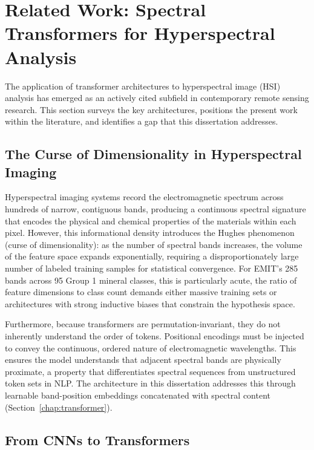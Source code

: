 \documentclass[11pt]{report}
\begin{document}
\section{Related Work: Spectral Transformers for Hyperspectral Analysis}

The application of transformer architectures to hyperspectral image (HSI) analysis has emerged as an actively cited subfield in contemporary remote sensing research.
This section surveys the key architectures, positions the present work within the literature, and identifies a gap that this dissertation addresses.

\subsection{The Curse of Dimensionality in Hyperspectral Imaging}

Hyperspectral imaging systems record the electromagnetic spectrum across hundreds of narrow, contiguous bands, producing a continuous spectral signature that encodes the physical and chemical properties of the materials within each pixel.
However, this informational density introduces the Hughes phenomenon (curse of dimensionality): as the number of spectral bands increases, the volume of the feature space expands exponentially, requiring a disproportionately large number of labeled training samples for statistical convergence.
For EMIT's 285 bands across 95 Group 1 mineral classes, this is particularly acute, the ratio of feature dimensions to class count demands either massive training sets or architectures with strong inductive biases that constrain the hypothesis space.

Furthermore, because transformers are permutation-invariant, they do not inherently understand the order of tokens.
Positional encodings must be injected to convey the continuous, ordered nature of electromagnetic wavelengths.
This ensures the model understands that adjacent spectral bands are physically proximate, a property that differentiates spectral sequences from unstructured token sets in NLP.
The architecture in this dissertation addresses this through learnable band-position embeddings concatenated with spectral content (Section~\ref{chap:transformer}).

\subsection{From CNNs to Transformers}
\end{document}
